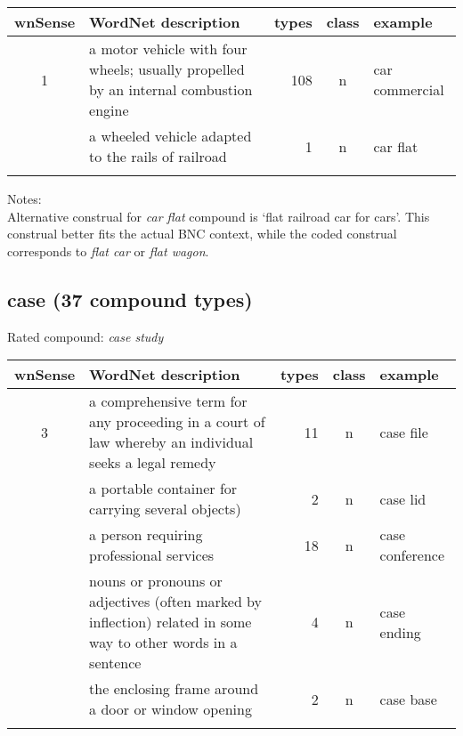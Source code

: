 \vspace*{1ex}

\noindent
\begin{longtable}{c>{\raggedright\arraybackslash}p{5cm}rc>{\raggedright\arraybackslash}p{2cm}}\lsptoprule
{\small wnSense}&WordNet description&types&class&example\\\midrule
1&a motor vehicle with four wheels; usually propelled by an internal combustion engine&108&n& car commercial\\\tablevspace
2&a wheeled vehicle adapted to the rails of railroad&1&n&car flat\\\lspbottomrule
\end{longtable}

\noindent
Notes:\\ Alternative construal for \emph{car flat} compound is `flat railroad car
for cars'. This construal better fits the actual BNC context, while
the coded construal corresponds to \emph{flat car} or \emph{flat
  wagon}. 
\subsection{case (37 compound types)}
Rated compound: \emph{case study}

\vspace*{.0ex}

\noindent
\begin{longtable}{c>{\raggedright\arraybackslash}p{5cm}rc>{\raggedright\arraybackslash}p{2cm}}\lsptoprule
{\small wnSense}&WordNet description&types&class&example\\\midrule
3&a comprehensive term for any proceeding in a court of law whereby an
individual seeks a legal remedy&11&n&case file\\\tablevspace
5&a portable container for carrying several objects)&2&n&case lid\\\tablevspace
6&a person requiring professional services&18&n&case conference\\\tablevspace
11&nouns or pronouns or adjectives (often marked by inflection)
related in some way to other words in a sentence&4&n&case ending\\\tablevspace
17&the enclosing frame around a door or window opening&2&n&case base\\\lspbottomrule
\end{longtable}

